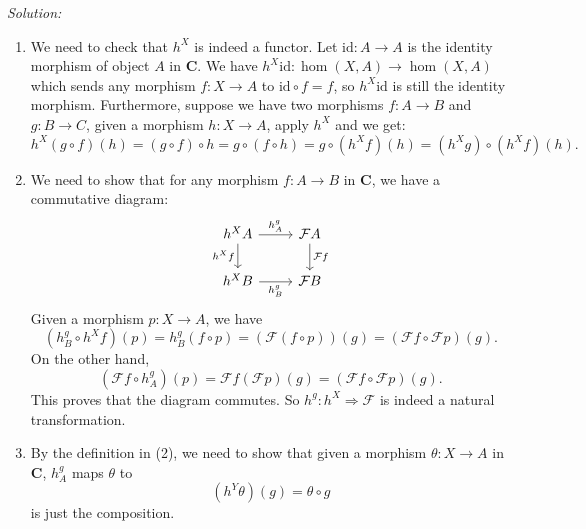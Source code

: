 \documentclass[a4paper, 11pt]{article}
\newenvironment{solution}
    {\textit{Solution:}}
    {}
\begin{document}
\begin{solution}
\begin{enumerate}
 \item We need to check that \(h^X\) is indeed a functor. Let \(\text{id}:A\rightarrow A\) is the identity morphism of object \(A\) in \(\mathbf{C}\). We have \(h^X\text{id}:\hom (X,A)\rightarrow \hom (X,A)\) which sends 
       any morphism \(f:X\rightarrow A\) to \(\text{id}\circ f=f\), so \(h^X\text{id}\) is still the identity morphism. Furthermore, suppose we have two morphisms \(f:A\rightarrow B\) and \(g:B\rightarrow C\), given a morphism \(h:X\rightarrow A\), apply \(h^X\) and we get:
       $$h^X(g\circ f)(h)=(g\circ f)\circ h=g\circ (f\circ h)=g\circ (h^Xf)(h)=(h^Xg)\circ(h^Xf)(h).$$
 \item We need to show that for any morphism \(f:A\rightarrow B\) in \(\mathbf{C}\), we have a commutative diagram:
       $$\begin{tikzcd}
	{h^XA} & {\mathcal{F}A} \\
	{h^XB} & {\mathcal{F}B}
	\arrow["{h^g_A}", from=1-1, to=1-2]
	\arrow["{h^Xf}"', from=1-1, to=2-1]
	\arrow["{\mathcal{F}f}", from=1-2, to=2-2]
	\arrow["{h^g_B}"', from=2-1, to=2-2]
\end{tikzcd}$$
       Given a morphism \(p:X\rightarrow A\), we have 
       $$(h^g_B\circ h^Xf)(p)=h^g_B(f\circ p)=(\mathcal{F}(f\circ p))(g)=(\mathcal{F}f\circ \mathcal{F}p)(g).$$
       On the other hand, 
       $$(\mathcal{F}f\circ h^g_A)(p)=\mathcal{F}f(\mathcal{F}p)(g)=(\mathcal{F}f\circ \mathcal{F}p)(g).$$
       This proves that the diagram commutes. So \(h^g:h^X\Rightarrow \mathcal{F}\) is indeed a natural transformation.
 \item By the definition in (2), we need to show that given a morphism \(\theta:X\rightarrow A\) in \(\mathbf{C}\), \(h^g_A\) maps \(\theta\) to 
       $$(h^Y\theta)(g)=\theta\circ g$$
       is just the composition.  
\end{enumerate}
\end{solution}
\end{document}
